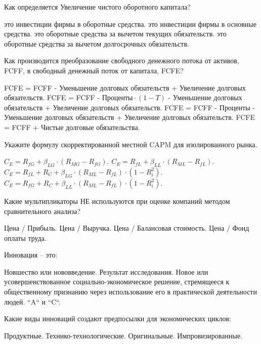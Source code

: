 \documentclass[12pt, table]{exam}
\begin{document}
\begin{questions}
\begin{multicols}{2}
\question Как определяется Увеличение чистого оборотного капитала?
\begin{choices}
	\CC это инвестиции фирмы в оборотные средства. 
	\choice это инвестиции фирмы в основные средства.
	\choice это оборотные средства за вычетом текущих обязательств.
	\choice это оборотные средства за вычетом долгосрочных обязательств.
\end{choices}

\question Как производится преобразование свободного денежного потока от активов, FCFF, в свободный денежный поток от капитала, FCFE?
\begin{choices}
	\choice FCFE = FCFF - Уменьшение долговых обязательств + Увеличение долговых обязательств.
	\CC FCFE = FCFF - $\text{Проценты} \cdot (1-T)$ - Уменьшение долговых обязательств + Увеличение долговых обязательств.
	\choice FCFE = FCFF - $\text{Проценты}$ - Уменьшение долговых обязательств + Увеличение долговых обязательств.
	\choice FCFE = FCFF + Чистые долговые обязательства.
\end{choices}

\question Укажите формулу скорректированной местной CAPM для изолированного рынка.
\begin{choices}
	\choice $C_E=R_{fG}+\beta_{LG} \cdot (R_{MG}-R_{fG})$.
	\choice $C_E=R_{fL}+\beta_{LL} \cdot (R_{ML}-R_{fL})$.
	\choice $C_E=R_{fL}+R_C+\beta_{LG} \cdot (R_{ML}-R_{fL} ) \cdot (1-R_i^2)$.
	\CC $C_E=R_{fG}+R_C+\beta_{LL} \cdot (R_{ML}-R_{fL} ) \cdot (1-R_i^2 )$.
\end{choices}

\question Какие мультипликаторы НЕ используются при оценке компаний методом сравнительного анализа?
\begin{choices}
	\choice Цена / Прибыль.
	\choice Цена / Выручка.
	\choice Цена / Балансовая стоимость.
	\CC Цена / Фонд оплаты труда.
\end{choices}

\question Инновация – это:
\begin{choices}
	\choice Новшество или нововведение.
	\choice Результат исследования.
	\CC Новое или усовершенствованное социально-экономическое решение, стремящееся к общественному признанию через использование его в практической деятельности людей.
	\choice ``A`` и ``C``.
\end{choices}

\question Какие виды инноваций создают предпосылки для экономических циклов:
\begin{choices}
	\choice Продуктные.
	\CC Технико-технологические.
	\choice Оригинальные.
	\choice Импровизированные.
\end{choices}


\end{multicols}
\end{questions}
\end{document}
